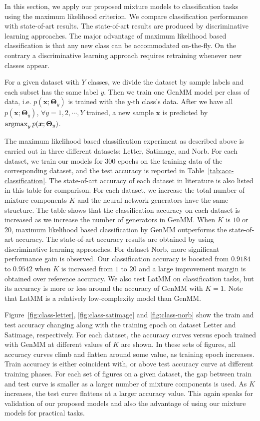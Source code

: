 In this section, we apply our proposed mixture models to classification tasks using the maximum likelihood criterion. We compare classification performance with state-of-art results. The state-of-art results are produced by discriminative learning approaches. The major advantage of maximum likelihood based classification is that any new class can be accommodated on-the-fly. On the contrary a discriminative learning approach requires retraining whenever new classes appear. 

For a given dataset with $Y$ classes, we divide the dataset by sample labels and each subset has the same label $y$. Then we train one GenMM model per class of data, i.e. $p(\bm{x};\bm{\Theta}_{y})$ is trained with the $y$-th class's data. After we have all $p(\bm{x};\bm{\Theta}_y)$, $\forall y = 1, 2, \cdots, Y$ trained, a new sample $\bm{x}$ is predicted by $\operatorname{argmax}_{y} p(\bm{x};\bm{\Theta}_y)$.

The maximum likelihood based classification experiment as described above is carried out in three different datasets: Letter, Satimage, and Norb. For each dataset, we train our models for $300$ epochs on the training data of the corresponding dataset, and the test accuracy is reported in Table~\ref{tab:acc-classification}. The state-of-art accuracy of each dataset in literature is also listed in this table for comparison. For each dataset, we increase the total number of mixture components $K$ and the neural network generators have the same structure. The table shows that the classification accuracy on each dataset is increased as we increase the number of generators in GenMM. When $K$ is $10$ or $20$, maximum likelihood based classification by GenMM outperforms the state-of-art accuracy. The state-of-art accuracy results are obtained by using discriminative learning approaches. For dataset Norb, more significant performance gain is observed. Our classification accuracy is boosted from $0.9184$ to $0.9542$ when $K$ is increased from $1$ to $20$ and a large improvement margin is obtained over reference accuracy. We also test LatMM on classification tasks, but its accuracy is more or less around the accuracy of GenMM with $K=1$. Note that LatMM is a relatively low-complexity model than GenMM. 

Figure~\ref{fig:class-letter}, \ref{fig:class-satimage} and \ref{fig:class-norb} show the train and test accuracy changing along with the training epoch on dataset Letter and Satimage, respectively. For each dataset, the accuracy curves versus epoch trained with GenMM at different values of $K$ are shown. In these sets of figures, all accuracy curves climb and flatten around some value, as training epoch increases. Train accuracy is either coincident with, or above test accuracy curve at different training phases. For each set of figures on a given dataset, the gap between train and test curve is smaller as a larger number of mixture components is used. As $K$ increases, the test curve flattens at a larger accuracy value. This again speaks for validation of our proposed models and also the advantage of using our mixture models for practical tasks.

